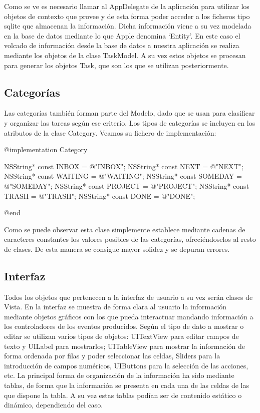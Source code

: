 \documentclass[parskip=half*]{scrartcl}
\begin{document}
Como se ve es necesario llamar al AppDelegate de la aplicaci\'on para utilizar los objetos de contexto que provee y de esta forma poder acceder a los ficheros tipo sqlite que almacenan la informaci\'on. Dicha informaci\'on viene a su vez modelada en la base de datos mediante lo que Apple denomina `Entity'. En este caso el volcado de informaci\'on desde la base de datos a nuestra aplicaci\'on se realiza mediante los objetos de la clase TaskModel. A su vez estos objetos se procesan para generar los objetos Task, que son los que se utilizan posteriormente.



\subsection{Categor\'ias}

Las categor\'ias tambi\'en forman parte del Modelo, dado que se usan para clasificar y organizar las tareas seg\'un ese criterio. Los tipos de categor\'ias se incluyen en los atributos de la clase Category. Veamos su fichero de implementaci\'on:

\begin{verbatimtab}
@implementation Category

NSString* const INBOX = @"INBOX";
NSString* const NEXT = @"NEXT";
NSString* const WAITING = @"WAITING";
NSString* const SOMEDAY = @"SOMEDAY";
NSString* const PROJECT = @"PROJECT";
NSString* const TRASH = @"TRASH";
NSString* const DONE = @"DONE";

@end
\end{verbatimtab}

Como se puede observar esta clase simplemente establece mediante cadenas de caracteres constantes los valores posibles de las categor\'ias, ofreci\'endoselos al resto de clases. De esta manera se consigue mayor solidez y se depuran errores.

\subsection{Interfaz}

Todos los objetos que pertenecen a la interfaz de usuario a su vez ser\'an clases de Vista. En la interfaz se muestra de forma clara al usuario la informaci\'on mediante objetos gr\'aficos con los que pueda interactuar mandando informaci\'on a los controladores de los eventos producidos. Seg\'un el tipo de dato a mostrar o editar se utilizan varios tipos de objetos: UITextView para editar campos de texto y UILabel para mostrarlos; UITableView para mostrar la informaci\'on de forma ordenada por filas y poder seleccionar las celdas, Sliders para la introducci\'on de campos num\'ericos, UIButtons para la selecci\'on de las acciones, etc. La principal forma de organizaci\'on de la informaci\'on ha sido mediante tablas, de forma que la informaci\'on se presenta en cada una de las celdas de las que dispone la tabla. A su vez estas tablas pod\'ian ser de contenido est\'atico o din\'amico, dependiendo del caso.
\end{document}
